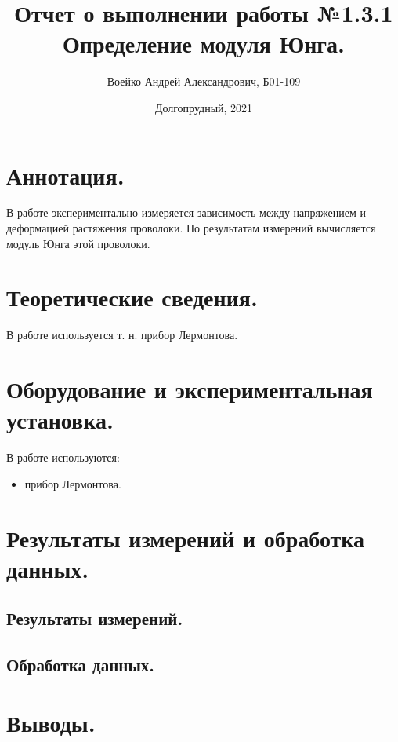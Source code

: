 \documentclass[a4paper,11pt]{article}
\title{Отчет о выполнении работы №1.3.1\\Определение модуля Юнга.}
\author{Воейко Андрей Александрович, Б01-109}
\date{Долгопрудный, 2021}
\begin{document}
\maketitle
\newpage
\section{Аннотация.}
В работе экспериментально измеряется зависимость между напряжением и деформацией  растяжения проволоки. По результатам измерений вычисляется модуль Юнга этой проволоки.
\section{Теоретические сведения.}
В работе используется т. н. прибор Лермонтова.
\section{Оборудование и экспериментальная установка.}
В работе используются:
\begin{itemize}
        \item прибор Лермонтова.
\end{itemize}
\section{Результаты измерений и обработка данных.}
\subsection{Результаты измерений.}
\subsection{Обработка данных.}
\section{Выводы.}
\end{document}
